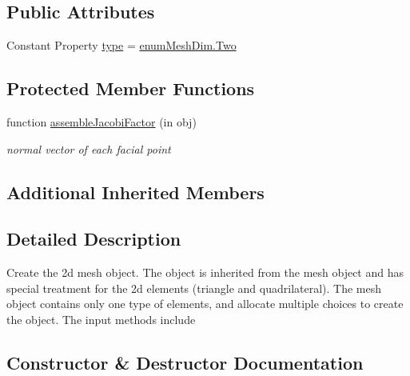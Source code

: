 \subsection*{Public Attributes}
\begin{DoxyCompactItemize}
\item 
Constant Property \hyperlink{class_ndg_mesh2d_a48b5c79f0e0f040c8c425bfa26fe515c}{type} = \hyperlink{classenum_mesh_dim_a5a67c42a0c79eab8e32b9c613507a672af027c134a34d29d25d620ecb88abf423}{enum\+Mesh\+Dim.\+Two}
\end{DoxyCompactItemize}
\subsection*{Protected Member Functions}
\begin{DoxyCompactItemize}
\item 
function \hyperlink{class_ndg_mesh2d_ae18efcc0cff8127857a737c1f57e07a1}{assemble\+Jacobi\+Factor} (in obj)
\begin{DoxyCompactList}\small\item\em normal vector of each facial point \end{DoxyCompactList}\end{DoxyCompactItemize}
\subsection*{Additional Inherited Members}


\subsection{Detailed Description}
Create the 2d mesh object. The object is inherited from the mesh object and has special treatment for the 2d elements (triangle and quadrilateral). The mesh object contains only one type of elements, and allocate multiple choices to create the object. The input methods include 

\subsection{Constructor \& Destructor Documentation}
\mbox{\label{class_ndg_mesh2d_a32859ff1a6c18eaebf90615e81ded188}} 
